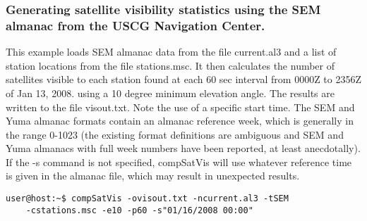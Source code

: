 \subsubsection{Generating satellite visibility statistics using the SEM almanac from the USCG Navigation Center.} 
This example loads SEM almanac data from the file current.al3 and a list of station locations from the file stations.msc. It then calculates the number of satellites visible to each station found at each 60 sec interval from 0000Z to 2356Z of Jan 13, 2008. using a 10 degree minimum elevation angle. The results are written to the file visout.txt. Note the use of a specific start time. The SEM and Yuma almanac formats contain an almanac reference week, which is generally in the range 0-1023 (the existing format definitions are ambiguous and SEM and Yuma almanacs with full week numbers have been reported, at least anecdotally). If the -s command is not specified, compSatVis will use whatever reference time is given in the almanac file, which may result in unexpected results.
\begin{verbatim}
user@host:~$ compSatVis -ovisout.txt -ncurrent.al3 -tSEM 
	-cstations.msc -e10 -p60 -s"01/16/2008 00:00"
\end{verbatim}


%
